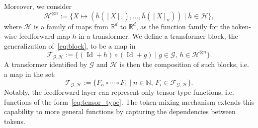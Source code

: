\documentclass{article}
\newcommand{\lt}[1]{{\footnotesize\textcolor{cyan!60!black}{\tt TL: #1}}}
\begin{document}
Moreover, we consider
\begin{equation}
    \mathcal{H}^{\otimes n}:=\{X\mapsto (\bar h([X]_1),\dots,\bar h([X]_n)) \mid \bar h\in \mathcal{H}\},
\end{equation}
where $\mathcal{H}$ is a family of maps from $\mathbb{R}^d$ to $\mathbb{R}^d$, as the function family for the token-wise feedforward map $h$ in a transformer.
We define a transformer block, the generalization of~\eqref{eq:block}, to be a map in
\begin{equation}
    \mathcal{F}_{\mathcal{G},\mathcal{H}}:=\{(\operatorname{Id}+h)\circ (\operatorname{Id}+g) \mid g\in\mathcal{G},\, h\in\mathcal{H}^{\otimes n}\}.
\end{equation}
A transformer identified by $\mathcal G$ and $\mathcal H$ is then the composition of such blocks, i.e. a map in the set:
\begin{equation}
    \label{eq:transformer_hypothesis}
    \mathcal{T}_{\mathcal{G},\mathcal{H}}:=\{F_n\circ\cdots\circ F_1 \mid n\in\mathbb{N},\, F_i\in\mathcal{F}_{\mathcal{G}, \mathcal{H}}\}.
\end{equation}
Notably, the feedforward layer can represent only tensor-type functions, i.e. functions of the form~\eqref{eq:tensor_type}.
The token-mixing mechanism extends this capability to more general functions by capturing the dependencies between tokens.
\end{document}
